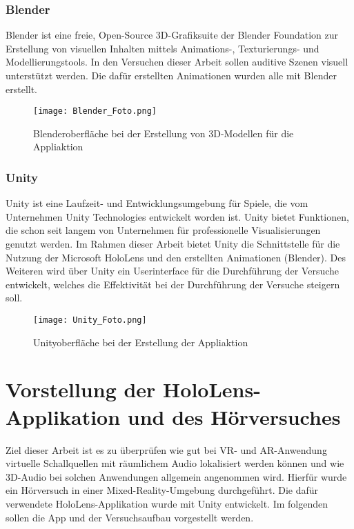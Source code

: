  \subsection{Blender}
 Blender ist eine freie, Open-Source 3D-Grafiksuite der Blender Foundation zur Erstellung von visuellen Inhalten mittels Animations-, Texturierungs- und Modellierungstools. In den Versuchen dieser Arbeit sollen auditive Szenen visuell unterstützt werden. Die dafür erstellten Animationen wurden alle mit Blender erstellt. 
 
 \begin{figure}[H]
\centering
\texttt{[image: Blender\_Foto.png]}
\caption{Blenderoberfläche bei der Erstellung von 3D-Modellen für die Appliaktion}
\label{fig:Blender}
\end{figure} 

 \subsection{Unity}
Unity ist eine  Laufzeit- und Entwicklungsumgebung für Spiele, die vom Unternehmen Unity Technologies entwickelt worden ist. Unity bietet Funktionen, die schon seit langem von Unternehmen für professionelle Visualisierungen genutzt werden. Im Rahmen dieser Arbeit bietet Unity die Schnittstelle für die Nutzung der Microsoft HoloLens und den erstellten Animationen (Blender). Des Weiteren wird über Unity ein Userinterface für die Durchführung der Versuche entwickelt, welches die Effektivität bei der Durchführung der Versuche steigern soll. 

  \begin{figure}[H]
\centering
\texttt{[image: Unity\_Foto.png]}
\caption{Unityoberfläche bei der Erstellung der Appliaktion}
\label{fig:Unity}
\end{figure} 


\chapter{Vorstellung der HoloLens-Applikation und des Hörversuches}

Ziel dieser Arbeit ist es zu überprüfen wie gut bei VR- und AR-Anwendung virtuelle Schallquellen mit räumlichem Audio lokalisiert werden können und wie 3D-Audio bei solchen Anwendungen allgemein angenommen wird. Hierfür wurde ein Hörversuch in einer Mixed-Reality-Umgebung durchgeführt. Die dafür verwendete HoloLens-Applikation wurde mit Unity entwickelt. Im folgenden sollen die App und der Versuchsaufbau vorgestellt werden. 


